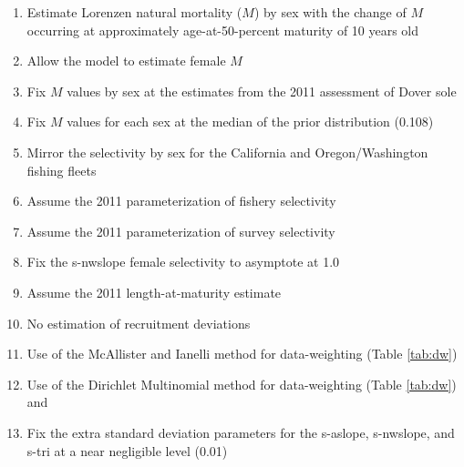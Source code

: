\documentclass[11pt,
  english,
  a4paper,
]{article}
\begin{document}
\begin{enumerate}
   
  \item Estimate Lorenzen natural mortality ($M$) by sex with the change of $M$ occurring at approximately age-at-50-percent maturity of 10 years old

  \item Allow the model to estimate female $M$

  \item Fix $M$ values by sex at the estimates from the 2011 assessment of Dover sole
  
  \item Fix $M$ values for each sex at the median of the prior distribution (0.108)
  
  \item Mirror the selectivity by sex for the California and Oregon/Washington fishing fleets

  \item Assume the 2011 parameterization of fishery selectivity

  \item Assume the 2011 parameterization of survey selectivity

  \item Fix the \gls{s-nwslope} female selectivity to asymptote at 1.0

  \item Assume the 2011 length-at-maturity estimate
  
  \item No estimation of recruitment deviations
  
  \item Use of the McAllister and Ianelli method for data-weighting (Table \ref{tab:dw})
  
  \item Use of the Dirichlet Multinomial method for data-weighting (Table \ref{tab:dw}) and
  
  \item Fix the extra standard deviation parameters for the \gls{s-aslope}, \gls{s-nwslope}, and \gls{s-tri} at a near negligible level (0.01)

\end{enumerate}

\end{document}
